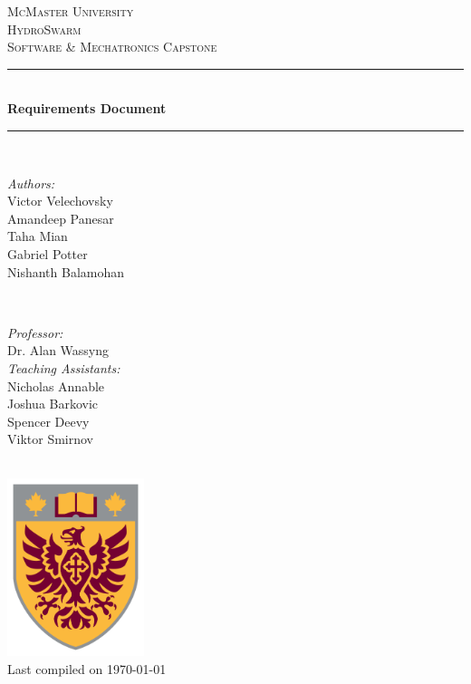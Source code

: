 \documentclass[11pt]{article}
\begin{document}
\newcommand{\PROJECTNAME}{HydroSwarm}

\begin{titlepage}
	\newcommand{\HRule}{\rule{\linewidth}{0.2mm}}
	\begin{center}
	\textsc{\LARGE McMaster University}\\[1.5cm]
	
	\textsc{\Large \PROJECTNAME}\\[0.5cm]
	\textsc{\large Software \& Mechatronics Capstone}\\[0.5cm] 

	\HRule\\[0.4cm]
		{\huge\bfseries Requirements Document}\\[0.4cm]
	\HRule\\[0.4cm]
	
	\begin{minipage}[t][][t]{0.5\textwidth}
		\begin{flushleft} \large
			\emph{Authors:}\\
			Victor Velechovsky \\
			Amandeep Panesar \\
			Taha Mian \\
			Gabriel Potter \\
			Nishanth Balamohan \\
		\end{flushleft}
	\end{minipage}
	~
	\begin{minipage}[t][][t]{0.4\textwidth}
		\begin{flushright} \large
			\emph{Professor:} \\
			Dr. Alan Wassyng \\[0.4cm]
			\emph{Teaching Assistants:} \\
			Nicholas Annable \\
			Joshua Barkovic \\
			Spencer Deevy \\
			Viktor Smirnov
		\end{flushright}
	\end{minipage}\\[2cm]
	
	\includegraphics[width=0.3\textwidth]{images/logo.png} \\
	{\large Last compiled on \today}
	\end{center}

\end{titlepage}
\end{document}
